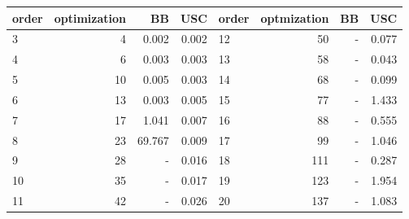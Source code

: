 \begin{tabular}[l]{l|r|r|r||l|r|r|r}
 \hline
 order & optimization & BB & USC & order & optmization & BB & USC \\
 \hline
 3  & 4 & \alert{0.002}  & \alert{0.002}   & 12 & 50  & -  & \alert{0.077}  \\
 4  & 6 & \alert{0.003}  & \alert{0.003}   & 13 & 58 & - & \alert{0.043} \\
 5  & 10 & 0.005  & \alert{0.003}   & 14 & 68 & -      & \alert{0.099} \\
 6  & 13 & \alert{0.003}  & 0.005   & 15 & 77  & -        & \alert{1.433}       \\
 7  & 17 & 1.041  & \alert{0.007}   & 16 & 88 & -       & \alert{0.555} \\
 8  & 23 & 69.767  & \alert{0.009}   & 17 & 99 & -        & \alert{1.046} \\
 9  & 28 & -  & \alert{0.016}   & 18 & 111 & -        & \alert{0.287} \\
 10 & 35 & -  & \alert{0.017}   & 19 & 123  & -       & \alert{1.954}       \\
 11 & 42 & -  & \alert{0.026}   & 20 & 137  & -    & \alert{1.083}       \\
 \hline
\end{tabular}